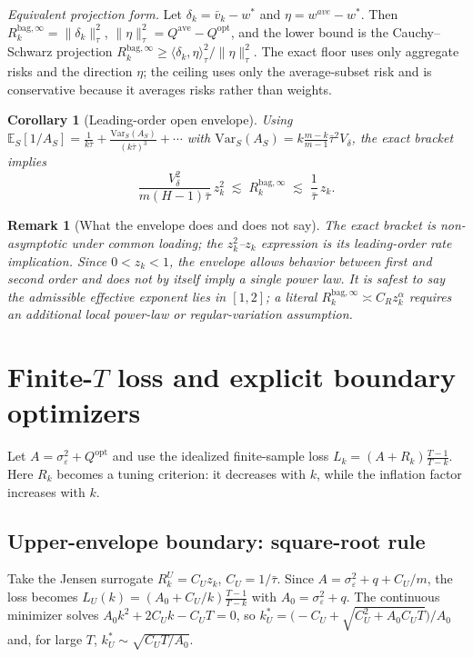 \documentclass[11pt]{article}
\newcommand{\E}{\mathbb{E}}
\newcommand{\Var}{\mathrm{Var}}
\newcommand{\Rbag}{R_k^{\mathrm{bag},\infty}}
\newcommand{\Qopt}{Q^{\mathrm{opt}}}
\newcommand{\Qave}{Q^{\mathrm{ave}}}
\newcommand{\inner}[2]{\langle #1,#2\rangle_\tau}
\newtheorem{corollary}{Corollary}
\newtheorem{remark}{Remark}
\begin{document}
\noindent\emph{Equivalent projection form.} Let $\delta_k=\bar v_k-w^\ast$ and
$\eta=w^{ave}-w^\ast$. Then $\Rbag=\|\delta_k\|_\tau^2$, $\|\eta\|_\tau^2=\Qave-\Qopt$, and
the lower bound is the Cauchy--Schwarz projection $\Rbag\ge\inner{\delta_k}{\eta}^2/
\|\eta\|_\tau^2$. The exact floor uses only aggregate risks and the direction $\eta$; the
ceiling uses only the average-subset risk and is conservative because it averages risks
rather than weights.

\begin{corollary}[Leading-order open envelope]\label{cor:open}
Using $\E_S[1/A_S]=\frac1{k\bar\tau}+\frac{\Var_S(A_S)}{(k\bar\tau)^3}+\cdots$ with
$\Var_S(A_S)=k\frac{m-k}{m-1}\bar\tau^2V_\delta$, the exact bracket implies
\[
  \frac{V_\delta^2}{m(H-1)\bar\tau}\,z_k^2\;\lesssim\;\Rbag\;\lesssim\;\frac1{\bar\tau}\,z_k .
\]
\end{corollary}

\begin{remark}[What the envelope does and does not say]
The exact bracket is non-asymptotic under common loading; the $z_k^2$--$z_k$ expression is its
leading-order rate implication. Since $0<z_k<1$, the envelope allows behavior between first
and second order and does not by itself imply a single power law. It is safest to say the
admissible effective exponent lies in $[1,2]$; a literal $\Rbag\asymp C_Rz_k^\alpha$ requires
an additional local power-law or regular-variation assumption.
\end{remark}

\section{Finite-$T$ loss and explicit boundary optimizers}
Let $A=\sigma_\varepsilon^2+\Qopt$ and use the idealized finite-sample loss
$L_k=(A+R_k)\frac{T-1}{T-k}$. Here $R_k$ becomes a tuning criterion: it decreases with $k$,
while the inflation factor increases with $k$.

\subsection{Upper-envelope boundary: square-root rule}
Take the Jensen surrogate $R_k^U=C_Uz_k$, $C_U=1/\bar\tau$. Since $A=\sigma_\varepsilon^2+q+
C_U/m$, the loss becomes $L_U(k)=(A_0+C_U/k)\frac{T-1}{T-k}$ with $A_0=\sigma_\varepsilon^2+q$.
The continuous minimizer solves $A_0k^2+2C_Uk-C_UT=0$, so
$k_U^\ast=\big(-C_U+\sqrt{C_U^2+A_0C_UT}\big)/A_0$ and, for large $T$,
$k_U^\ast\sim\sqrt{C_UT/A_0}$.
\end{document}
